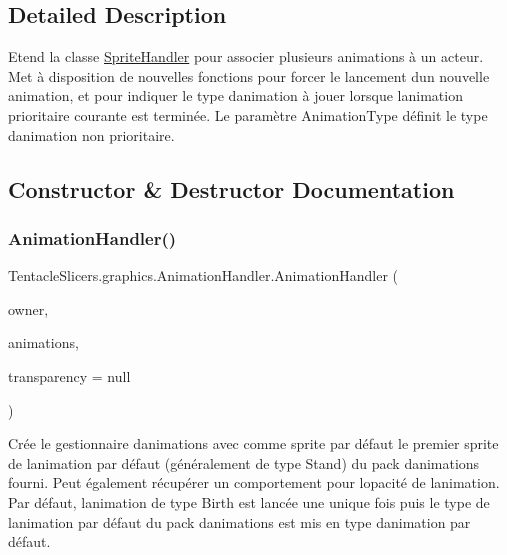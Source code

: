 \subsection{Detailed Description}
Etend la classe \hyperlink{class_tentacle_slicers_1_1graphics_1_1_sprite_handler}{Sprite\+Handler} pour associer plusieurs animations à un acteur. Met à disposition de nouvelles fonctions pour forcer le lancement d\textquotesingle{}un nouvelle animation, et pour indiquer le type d\textquotesingle{}animation à jouer lorsque l\textquotesingle{}animation prioritaire courante est terminée. Le paramètre Animation\+Type définit le type d\textquotesingle{}animation non prioritaire. 



\subsection{Constructor \& Destructor Documentation}
\mbox{\label{class_tentacle_slicers_1_1graphics_1_1_animation_handler_a08c5657382776774bfa54a9ea571447a}} 
\subsubsection{\texorpdfstring{Animation\+Handler()}{AnimationHandler()}\hspace{0.1cm}{\footnotesize\ttfamily [1/2]}}
{\footnotesize\ttfamily Tentacle\+Slicers.\+graphics.\+Animation\+Handler.\+Animation\+Handler (\begin{DoxyParamCaption}\item[{\hyperlink{class_tentacle_slicers_1_1actors_1_1_actor}{Actor}}]{owner,  }\item[{\hyperlink{class_tentacle_slicers_1_1graphics_1_1_animation_pack}{Animation\+Pack}}]{animations,  }\item[{\hyperlink{class_tentacle_slicers_1_1graphics_1_1_transparency_handler}{Transparency\+Handler}}]{transparency = {\ttfamily null} }\end{DoxyParamCaption})}



Crée le gestionnaire d\textquotesingle{}animations avec comme sprite par défaut le premier sprite de l\textquotesingle{}animation par défaut (généralement de type Stand) du pack d\textquotesingle{}animations fourni. Peut également récupérer un comportement pour l\textquotesingle{}opacité de l\textquotesingle{}animation. Par défaut, l\textquotesingle{}animation de type Birth est lancée une unique fois puis le type de l\textquotesingle{}animation par défaut du pack d\textquotesingle{}animations est mis en type d\textquotesingle{}animation par défaut. 


